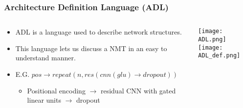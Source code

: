 \begin{frame}
\frametitle{Architecture Definition Language (ADL)}
    \begin{columns}
        \begin{column}{0.55\paperwidth}
        \begin{itemize}
            \item ADL is a language used to describe network structures.
            \item This language lets us discuss a NMT in an easy to understand manner.
            \item E.G. $pos \rightarrow repeat(n,res(cnn(glu) \rightarrow dropout))$ 
            \begin{itemize}
                \item Positional encoding $\rightarrow$ residual CNN with gated linear
                units $\rightarrow$ dropout
            \end{itemize}
        \end{itemize}
    \end{column}
        \begin{column}{0.39\paperwidth}
            \vspace{-1cm}
            \texttt{[image: ADL.png]}\\
            \texttt{[image: ADL\_def.png]}
        \end{column}
\end{columns}
\end{frame}
